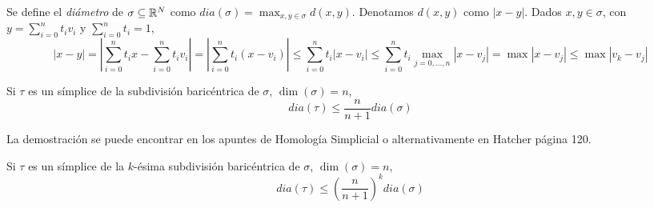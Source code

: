 \documentclass[TA.tex]{subfiles}
\begin{document}
Se define el \emph{diámetro} de $\sigma\subseteq \mathbb{R}^N$ como $dia(\sigma)=\max_{x,y\in\sigma} d(x,y)$. Denotamos $d(x,y)$ como $|x-y|$. Dados $x,y\in\sigma$, con $y=\sum_{i=0}^n t_iv_i$ y $\sum_{i=0}^nt_i=1$, 
\[
|x-y|=\left|\sum_{i=0}^nt_ix-\sum_{i=0}^nt_iv_i\right|=\left|\sum_{i=0}^nt_i(x-v_i)\right|\leq \sum_{i=0}^n t_i|x-v_i|\leq \sum_{i=0}^nt_i\max_{j=0,\dots, n}|x-v_j|=\max|x-v_j|\leq \max|v_k-v_j|
\]

\begin{lemma}
 Si $\tau$ es un símplice de la subdivisión baricéntrica de $\sigma$, $\dim(\sigma)=n$, 
\[
dia(\tau)\leq\frac{n}{n+1}dia(\sigma)
\]
\end{lemma}

La demostración se puede encontrar en los apuntes de Homología Simplicial o alternativamente en Hatcher página 120. 

\begin{coro}
Si $\tau$ es un símplice de la $k$-ésima subdivisión baricéntrica de $\sigma$, $\dim(\sigma)=n$, 
\[
dia(\tau)\leq \left(\frac{n}{n+1}\right)^k dia(\sigma)
\]
\end{coro}
\end{document}

